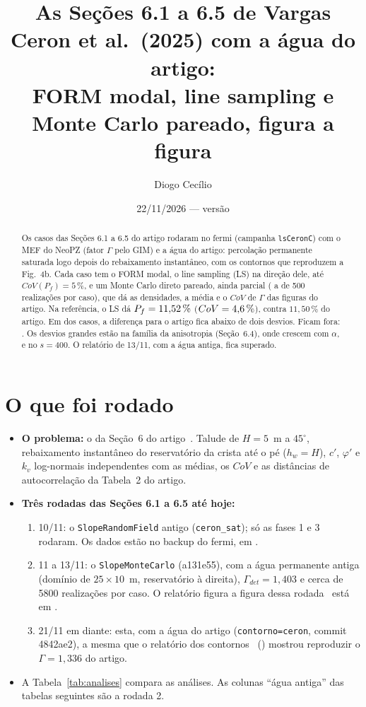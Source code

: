 \documentclass[11pt,a4paper]{article}
\title{As Seções 6.1 a 6.5 de Vargas Ceron et al.\ (2025) com a água do artigo:\\ FORM modal, line sampling e Monte
Carlo pareado, figura a figura}
\author{Diogo Cecílio}
\date{22/11/2026 --- versão \versao}
\begin{document}
\maketitle
\begin{abstract}
Os \nCasos{} casos das Seções 6.1 a 6.5 do artigo rodaram no fermi (campanha \texttt{lsCeronC}) com o MEF do NeoPZ
(fator $\Gamma$ pelo GIM) e a água do artigo: percolação permanente saturada logo depois do rebaixamento instantâneo,
com os contornos que reproduzem a Fig.~4b. Cada caso tem o FORM modal, o line sampling (LS) na direção dele, até
$CoV(P_f) = 5\,\%$, e um Monte Carlo direto pareado, ainda parcial (\nMCmin{} a \nMCmax{} de 500 realizações por caso),
que dá as densidades, a média e o $CoV$ de $\Gamma$ das figuras do artigo. Na referência, o LS dá
$P_f = 11{,}52\,\%$ ($CoV = 4{,}6\,\%$), contra $11{,}50\,\%$ do artigo. Em \nZdois{} dos \nCasos{} casos, a
diferença para o artigo fica abaixo de dois desvios. Ficam fora: \casosFora. Os desvios grandes estão na família da
anisotropia (Seção~6.4), onde crescem com $\alpha$, e no $s = 400$. O relatório de 13/11, com a água antiga, fica
superado.
\end{abstract}
\tableofcontents

\section{O que foi rodado}\label{sec:rodado}
\begin{itemize}
  \item \textbf{O problema:} o da Seção~6 do artigo~\cite{ceron2025}. Talude de $H = 5$~m a $45^\circ$, rebaixamento instantâneo do
    reservatório da crista até o pé ($h_w = H$), $c'$, $\varphi'$ e $k_v$ log-normais independentes com as médias, os
    $CoV$ e as distâncias de autocorrelação da Tabela~2 do artigo.
  \item \textbf{Três rodadas das Seções 6.1 a 6.5 até hoje:}
    \begin{enumerate}
      \item 10/11: o \texttt{SlopeRandomField} antigo (\texttt{ceron\_sat}); só as fases 1 e 3 rodaram. Os dados estão
        no backup do fermi, em .
      \item 11 a 13/11: o \texttt{SlopeMonteCarlo} (a131e55), com a água permanente antiga (domínio de $25 \times
        10$~m, reservatório à direita), $\Gamma_{det} = 1{,}403$ e cerca de 5800 realizações por caso. O relatório
        figura a figura dessa rodada~\cite{antigo} está em .
      \item 21/11 em diante: esta, com a água do artigo (\texttt{contorno=ceron}, commit 4842ae2), a mesma que o
        relatório dos contornos~\cite{contornos} () mostrou reproduzir o
        $\Gamma = 1{,}336$ do artigo.
    \end{enumerate}
  \item A Tabela~\ref{tab:analises} compara as análises. As colunas ``água antiga'' das tabelas seguintes são a
    rodada 2.
\end{itemize}
\end{document}
